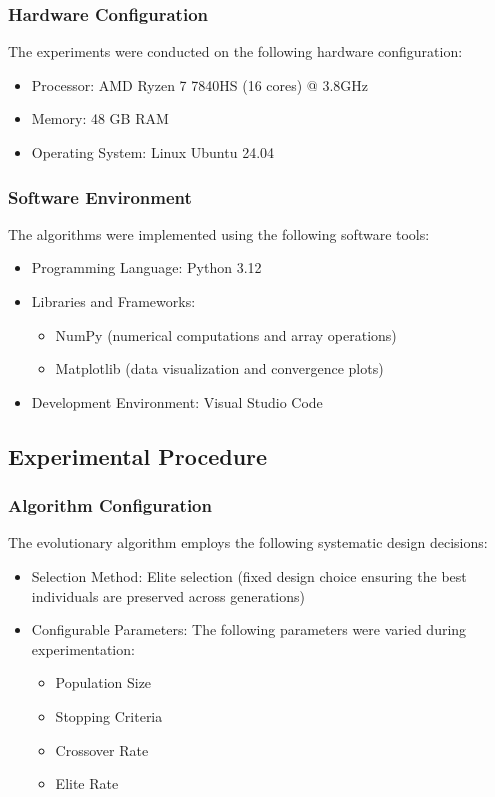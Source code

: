 \documentclass{scrartcl}
\begin{document}
\subsubsection{Hardware Configuration}
The experiments were conducted on the following hardware configuration:
\begin{itemize}
    \item Processor: AMD Ryzen 7 7840HS (16 cores) @ 3.8GHz
    \item Memory: 48 GB RAM
    \item Operating System: Linux Ubuntu 24.04
\end{itemize}

\subsubsection{Software Environment}
The algorithms were implemented using the following software tools:
\begin{itemize}
    \item Programming Language: Python 3.12
    \item Libraries and Frameworks: 
    \begin{itemize}
        \item NumPy (numerical computations and array operations)
        \item Matplotlib (data visualization and convergence plots)
    \end{itemize}
    \item Development Environment: Visual Studio Code
\end{itemize}

\subsection{Experimental Procedure}

\subsubsection{Algorithm Configuration}

The evolutionary algorithm employs the following systematic design decisions:

\begin{itemize}
  \item{Selection Method}: Elite selection (fixed design choice ensuring the best individuals are preserved across generations)
  \item{Configurable Parameters}: The following parameters were varied during experimentation:
  \begin{itemize}
    \item{Population Size}
    \item{Stopping Criteria}
    \item{Crossover Rate}
    \item{Elite Rate}
  \end{itemize}
\end{itemize}
\end{document}
